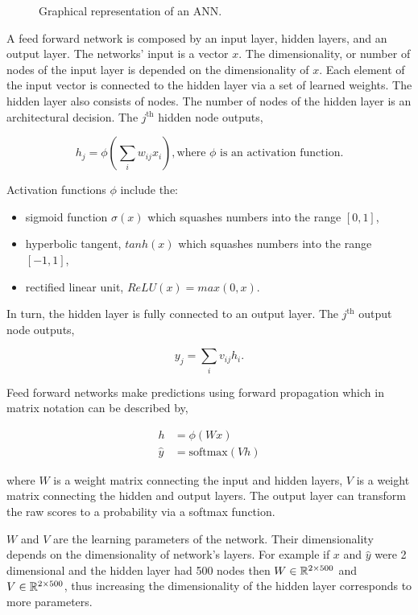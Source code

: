 \begin{figure}[!htbp]
    \centering
    
    \caption{Graphical representation of an ANN.}\label{fig:ann}
\end{figure}

A feed forward network is composed by an input layer, hidden layers, and an
output layer. The networks' input is a vector \(x\). The dimensionality, or
number of nodes of the input layer is depended on the dimensionality of \(x\).
Each element of the input vector is connected to the hidden layer via a set of
learned weights. The hidden layer also consists of nodes. The number of
nodes of the hidden layer is an architectural decision. The \(j^{\text{th}}\)
hidden node outputs,

\[h_j = \phi (\sum_{i} w_{ij} x_{i}), \text{where } \phi  \text{ is an activation function}.\]

Activation functions \(\phi\) include the:

\begin{itemize}
    \item sigmoid function \(\sigma(x)\) which squashes numbers into the range \([0, 1]\),
    \item hyperbolic tangent, \(tanh(x)\) which squashes numbers into the range \([-1, 1]\),
    \item rectified linear unit, \(ReLU(x)=max(0,x)\).
\end{itemize}

In turn, the hidden layer is fully connected to an output layer. The
\(j^{\text{th}}\) output node outputs,

\[y_{j} = \sum_{i} v_{ij} h_{i}.\]

Feed forward networks make predictions using forward propagation which in matrix
notation can be described by,

\begin{align}\label{eq:neural_network_equations}
h & = \phi(Wx) \\ \label{eq:neural_network_equations_two}
\hat{y} & = \text{softmax}(Vh)
\end{align}

where \(W\) is a weight matrix connecting the input and hidden layers, \(V\) is
a weight matrix connecting the hidden and output layers. The output layer
can transform the raw scores to a probability via a softmax function.

\(W\) and \(V\) are the learning parameters of the network. Their dimensionality
depends on the dimensionality of network's layers. For example if \(x\) and \(\hat{y}\)
were 2 dimensional and the hidden layer had 500 nodes then \(W \in \mathbb{R}^{2 \times 500}\)
and \(V \in \mathbb{R}^{2 \times 500}\), thus increasing the dimensionality of the hidden
layer corresponds to more parameters.

